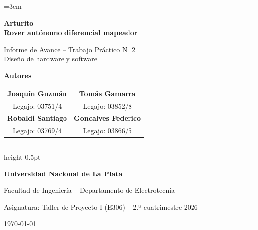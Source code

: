\documentclass[12pt,a4paper]{article}
\begin{document}

\emergencystretch=3em

\begin{titlepage}
    \thispagestyle{empty}
    \centering

    \vspace*{1.5cm}

    {\huge \bfseries Arturito\\[0.3em] Rover autónomo diferencial mapeador \par}
    \vspace{0.8cm}
    {\Large Informe de Avance -- Trabajo Práctico N$^\circ$ 2\\[0.3em]
    Diseño de hardware y software \par}

    \vfill

    {\Large \bfseries Autores \par}
    \vspace{0.6cm}
    \begin{tabular}{c c}
        \textbf{Joaquín Guzmán} & \textbf{Tomás Gamarra} \\
        \small Legajo: 03751/4 & \small Legajo: 03852/8 \\[1.5em]
        \textbf{Robaldi Santiago} & \textbf{Goncalves Federico} \\
        \small Legajo: 03769/4 & \small Legajo: 03866/5
    \end{tabular}

    \vspace{1.5cm}

    \hrule height 0.5pt
    \vspace{0.4cm}

    {\large \textbf{Universidad Nacional de La Plata}} \par
    \vspace{0.15cm}
    {Facultad de Ingeniería -- Departamento de Electrotecnia} \par
    \vspace{0.15cm}
    {\small Asignatura: Taller de Proyecto I (E306) -- 2.º cuatrimestre 2026} \par
    \vspace{0.3cm}
    {\small \today}

\end{titlepage}
\end{document}
